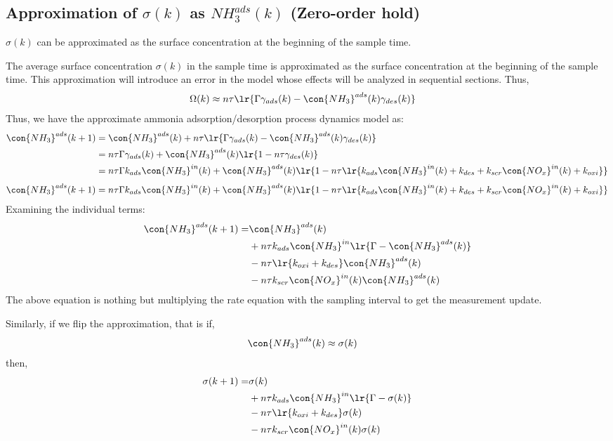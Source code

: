 \subsection{Approximation of $\sigma(k)$ as $NH_3^{ads}(k)$ (Zero-order hold)}
 $\sigma(k)$ can be approximated as the surface concentration at the beginning of the sample time.

The average surface concentration $\sigma(k)$ in the sample time is approximated as the surface concentration at the
beginning of the sample time. This approximation will introduce an error in the model whose effects will be analyzed in
sequential sections. Thus,
\begin{align}
    \Omega(k) &\approx n \tau \lr{\Gamma \gamma_{ads} (k) - \con{NH_3}^{ads}(k) \gamma_{des} (k)}
\end{align}
Thus, we have the approximate ammonia adsorption/desorption process dynamics model as:
\begin{align*}
    \con{NH_3}^{ads}(k + 1) &= \con{NH_3}^{ads} (k) + n \tau \lr{\Gamma \gamma_{ads} (k) - \con{NH_3}^{ads}(k) \gamma_{des} (k)}\\
    &= n \tau \Gamma \gamma_{ads} (k) + \con{NH_3}^{ads} (k) \lr{1 - n \tau \gamma_{des} (k)}\\
    &= n \tau \Gamma k_{ads} \con{NH_3}^{in}(k)  + \con{NH_3}^{ads} (k) \lr{1 - n \tau \lr{k_{ads} \con{NH_3}^{in}(k) + k_{des} + k_{scr} \con{NO_x}^{in}(k) + k_{oxi}}}
\end{align*}
\begin{multline}
    \con{NH_3}^{ads}(k + 1) = n \tau \Gamma k_{ads} \con{NH_3}^{in}(k)  + \con{NH_3}^{ads} (k) \lr{1 - n \tau \lr{k_{ads} \con{NH_3}^{in}(k) + k_{des} + k_{scr} \con{NO_x}^{in}(k) + k_{oxi}}}
\end{multline}
Examining the individual terms:
\begin{align*}
    \con{NH_3}^{ads}(k + 1) =& \con{NH_3}^{ads}(k)\\
        &+ n\tau k_{ads} \con{NH_3}^{in} \lr{\Gamma - \con{NH_3}^{ads}(k)} \\
        &- n \tau \lr{k_{oxi} + k_{des}} \con{NH_3}^{ads} (k)\\
        &- n \tau k_{scr} \con{NO_x}^{in}(k) \con{NH_3}^{ads}(k)
\end{align*}
The above equation is nothing but multiplying the rate equation with the sampling interval to get the measurement
update.

Similarly, if we flip the approximation, that is if,
\begin{align*}
    \con{NH_3}^{ads}(k) &\approx \sigma(k)
\end{align*}
then,
\begin{align*}
    \sigma(k + 1) =& \sigma(k)\\
        &+ n\tau k_{ads} \con{NH_3}^{in} \lr{\Gamma - \sigma(k)} \\
        &- n \tau \lr{k_{oxi} + k_{des}} \sigma(k)\\
        &- n \tau k_{scr} \con{NO_x}^{in}(k) \sigma(k)
\end{align*}

